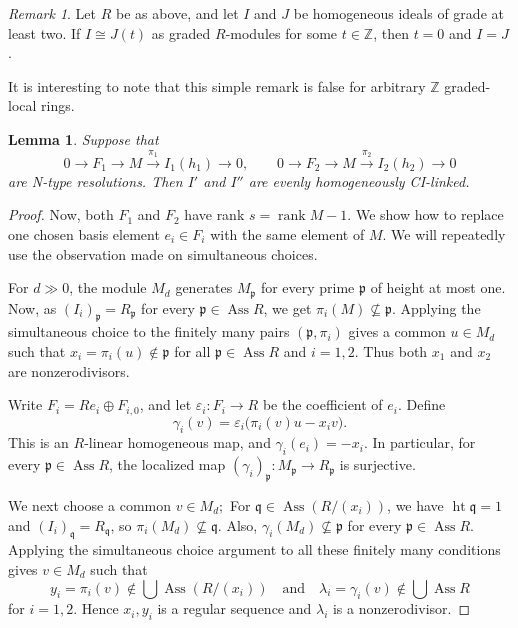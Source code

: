 \documentclass[11pt,letterpaper]{amsart}
\newcommand{\seq}{\subseteq}
\DeclareMathOperator{\Ass}{Ass}
\DeclareMathOperator{\rank}{rank}
\theoremstyle{plain}
\newtheorem{lem}[thm]{Lemma}
\theoremstyle{definition}
\theoremstyle{remark}
\newtheorem{remark}[thm]{Remark}
\begin{document}
\begin{remark}\label{rem:ideals-up-to-shift} Let $R$ be as above, and let $I$ and $J$ be homogeneous ideals of grade at least two. If
$I\cong J(t)$ as graded $R$-modules for some $t\in\mathbb Z$, then
$t=0$ and $I=J$.
\end{remark}
It is interesting to note that this simple remark is false for arbitrary $\mathbb Z$ graded-local rings. 

\begin{lem}\label{lem:compare}
Suppose that
\[
0\longrightarrow F_1\longrightarrow M\xrightarrow{\pi_1}I_1(h_1)\longrightarrow0,
\qquad
0\longrightarrow F_2\longrightarrow M\xrightarrow{\pi_2}I_2(h_2)\longrightarrow0
\]
are N-type resolutions. Then $I'$ and $I''$ are evenly homogeneously CI-linked.
\end{lem}
\begin{proof}
Now, both $F_1$ and $F_2$ have rank $s=\rank M-1$. We show how to replace one chosen basis element
$e_i\in F_i$ with the same element of $M$. We will repeatedly use the observation made on simultaneous choices.

For $d\gg0$, the module $M_d$ generates $M_{\mathfrak p}$ for
every prime $\mathfrak p$ of height at most one. Now, as $(I_i)_{\mathfrak p}=R_{\mathfrak p}$ for every $\mathfrak p\in\Ass R$, we get $\pi_i(M)\not\seq \mathfrak p$. Applying the simultaneous choice to the finitely many pairs $(\mathfrak p,\pi_i)$ gives a
common $u\in M_d$ such that $
x_i=\pi_i(u)\notin\mathfrak p$ for all $\mathfrak p\in\Ass R$ and $i=1,2$.
Thus both $x_1$ and $x_2$ are nonzerodivisors.

Write $F_i=Re_i\oplus F_{i,0}$, and let
$\varepsilon_i:F_i\to R$ be the coefficient of $e_i$. Define
\[
\gamma_i(v)=
\varepsilon_i\bigl(\pi_i(v)u-x_iv\bigr).
\]
This is an $R$-linear homogeneous map, and
$\gamma_i(e_i)=-x_i$. In particular, for every
$\mathfrak p\in\Ass R$, the localized map
$(\gamma_i)_{\mathfrak p}:M_{\mathfrak p}\to R_{\mathfrak p}$
is surjective.

We next choose a common $v\in M_d;$ For
$\mathfrak q\in\Ass(R/(x_i))$, we have
$\operatorname{ht}\mathfrak q=1$ and
$(I_i)_{\mathfrak q}=R_{\mathfrak q}$, so
$\pi_i(M_d)\not\seq\mathfrak q$. Also,
$\gamma_i(M_d)\not\seq\mathfrak p$ for every
$\mathfrak p\in\Ass R$. Applying the simultaneous choice argument to
all these finitely many conditions gives $v\in M_d$ such that
\[
y_i=\pi_i(v)\notin\bigcup\Ass(R/(x_i))
\quad\text{and}\quad
\lambda_i=\gamma_i(v)\notin\bigcup\Ass R
\]
for $i=1,2$. Hence $x_i,y_i$ is a regular sequence and
$\lambda_i$ is a nonzerodivisor.


\end{proof}
\end{document}
